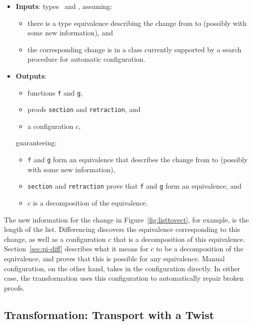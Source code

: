 \begin{itemize}
\item \textbf{Inputs}: types \Aa\ and \B, assuming:
\begin{itemize}
\item there is a type equivalence describing the change from \Aa to \B (possibly with some new information), and
\item the corresponding change is in a class currently supported by a search procedure for automatic configuration.
\end{itemize}
\item \textbf{Outputs}:
\begin{itemize}
\item functions \lstinline{f} and \lstinline{g},
\item proofs \lstinline{section} and \lstinline{retraction}, and
\item a configuration $c$,
\end{itemize}
guaranteeing:
\begin{itemize}
\item \lstinline{f} and \lstinline{g} form an equivalence that describes the change from \Aa to \B (possibly with some new information),
\item \lstinline{section} and \lstinline{retraction} prove that \lstinline{f} and \lstinline{g} form an equivalence, and
\item $c$ is a decomposition of the equivalence.
\end{itemize}
\end{itemize}
The new information for the change in Figure~\ref{fig:listtovect}, for example, is the length of the list.
Differencing discovers the equivalence corresponding to this change, as well as a configuration $c$ that is a decomposition of this equivalence.
Section~\ref{sec:pi-diff} describes what it means for $c$ to be a decomposition of the equivalence,
and proves that this is possible for any equivalence.
Manual configuration, on the other hand, takes in the configuration directly.
In either case, the transformation uses this configuration to automatically repair broken proofs.


\subsection{Transformation: Transport with a Twist}
\label{sec:pi-spec-trans}

